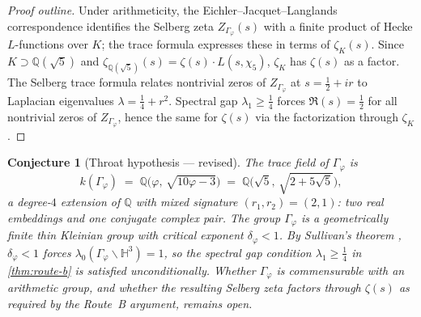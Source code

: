 \documentclass[11pt,a4paper]{article}
\theoremstyle{plain}
\newtheorem{conjecture}[theorem]{Conjecture}
\theoremstyle{definition}
\theoremstyle{remark}
\numberwithin{equation}{section}
\providecommand{\Q}{\mathbb{Q}}
\providecommand{\Hh}{\mathbb{H}}
\providecommand{\vp}{\varphi}
\providecommand{\half}{\tfrac{1}{2}}
\begin{document}
\begin{proof}[Proof outline]
Under arithmeticity, the Eichler--Jacquet--Langlands correspondence
identifies the Selberg zeta $Z_{\Gamma_\vp}(s)$ with a finite
product of Hecke $L$-functions over $K$; the trace formula
expresses these in terms of $\zeta_K(s)$.  Since
$K \supset \Q(\sqrt{5})$ and
$\zeta_{\Q(\sqrt{5})}(s) = \zeta(s) \cdot L(s, \chi_5)$,
$\zeta_K$ has $\zeta(s)$ as a factor.  The Selberg trace formula
relates nontrivial zeros of $Z_{\Gamma_\vp}$ at $s = \half + ir$ to
Laplacian eigenvalues $\lambda = \tfrac14 + r^2$.  Spectral gap
$\lambda_1 \ge \tfrac14$ forces $\Re(s) = \half$ for all
nontrivial zeros of $Z_{\Gamma_\vp}$, hence the same for $\zeta(s)$
via the factorization through $\zeta_K$.
\end{proof}

\begin{conjecture}[Throat hypothesis --- revised]
\label{conj:throat}
The trace field of $\Gamma_\vp$ is
\[
  k(\Gamma_\vp) \;=\; \Q\!\bigl(\vp,\,\sqrt{10\vp-3}\bigr)
  \;=\; \Q\!\bigl(\sqrt{5},\,\sqrt{2+5\sqrt{5}}\bigr),
\]
a degree-$4$ extension of $\Q$ with mixed signature
$(r_1,r_2) = (2,1)$: two real embeddings and one conjugate complex
pair.  The group $\Gamma_\vp$ is a geometrically finite thin
Kleinian group with critical exponent $\delta_\vp < 1$.
By Sullivan's theorem \cite{sullivan1987}, $\delta_\vp < 1$ forces
$\lambda_0(\Gamma_\vp \backslash \Hh^3) = 1$, so the spectral gap
condition $\lambda_1 \ge \tfrac14$ in \cref{thm:route-b} is
satisfied unconditionally.  Whether $\Gamma_\vp$ is commensurable
with an arithmetic group, and whether the resulting Selberg zeta
factors through $\zeta(s)$ as required by the Route~B argument,
remains open.
\end{conjecture}
\end{document}
